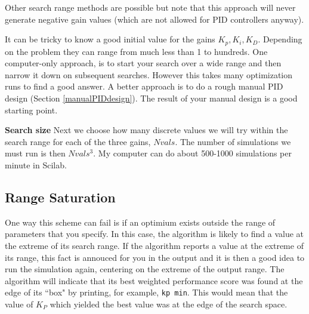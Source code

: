 Other search range methods are possible but  note that this approach will never generate negative gain values (which are not allowed for PID controllers anyway).	%





It can be tricky to know a good initial value for the gains $K_p,K_i, K_D$.   Depending on the problem they can range from much less than 1 to hundreds.   One computer-only approach, is to start your search over a wide range and then narrow it down on subsequent searches.  However this takes many optimization runs to find a good answer.   A better approach is to do a rough manual PID design (Section \ref{manualPIDdesign}).  The result of your manual design is a good starting point.

{\bf Search size} Next we choose how many discrete values we will try within the search range for each of the three gains, $Nvals$.  The number of simulations we must run is then $Nvals^3$.    My computer can   do about 500-1000 simulations per minute in Scilab.	%

%
%
%


\subsection{Range Saturation}

One way this scheme can fail is if an optimium exists outside the range of parameters that you specify.  In this case, the algorithm is likely to find a value at the extreme of its search range.  If the algorithm reports a value at the extreme of its range, this fact is annouced for you in the output and it is then a good idea to run the simulation again, centering on the extreme of the output range.   The algorithm will indicate that its best weighted performance score was found at the edge of its ``box" by printing, for example, {\tt kp min}.  This would mean that the value of $K_P$ which yielded the best value was at the edge of the search space.	%


